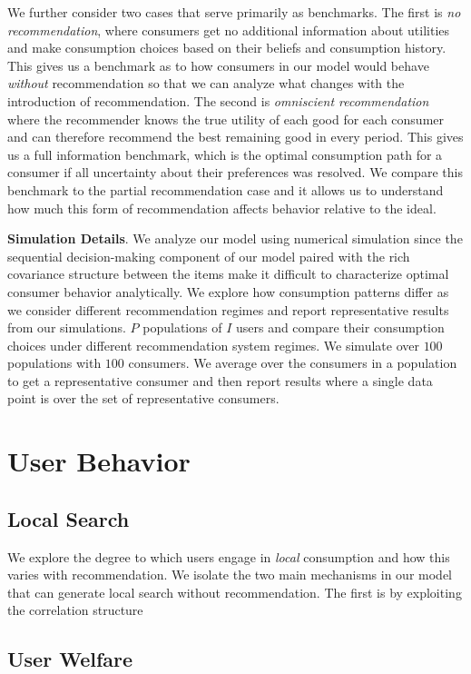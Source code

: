 \documentclass[sigconf]{acmart}
\begin{document}
We further consider two cases that serve primarily as benchmarks. The first is \textit{no recommendation}, where consumers get no additional information about utilities and make consumption choices based on their beliefs and consumption history. This gives us a benchmark as to how consumers in our model would behave \textit{without} recommendation so that we can analyze what changes with the introduction of recommendation. The second is \textit{omniscient recommendation} where the recommender knows the true utility of each good for each consumer and can therefore recommend the best remaining good in every period. This gives us a full information benchmark, which is the optimal consumption path for a consumer if all uncertainty about their preferences was resolved. We compare this benchmark to the partial recommendation case and it allows us to understand how much this form of recommendation affects behavior relative to the ideal.
\par
\noindent \textbf{Simulation Details}. We analyze our model using numerical simulation since the sequential decision-making component of our model paired with the rich covariance structure between the items make it difficult to characterize optimal consumer behavior analytically. We explore how consumption patterns differ as we consider different recommendation regimes and report representative results from our simulations. $P$ populations of $I$ users and compare their consumption choices under different recommendation system regimes. We simulate over $100$ populations with $100$ consumers. We average over the consumers in a population to get a representative consumer and then report results where a single data point is over the set of representative consumers.

\section{User Behavior}

\subsection{Local Search}

We explore the degree to which users engage in \textit{local} consumption and how this varies with recommendation. We isolate the two main mechanisms in our model that can generate local search without recommendation. The first is by exploiting the correlation structure

\subsection{User Welfare}
\end{document}
